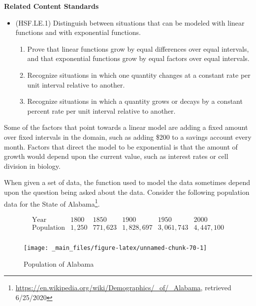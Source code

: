 \documentclass[
]{book}
\providecommand{\tightlist}{%
  \setlength{\itemsep}{0pt}\setlength{\parskip}{0pt}}
\newenvironment{standards}{}{}
\theoremstyle{definition}
\theoremstyle{definition}
\theoremstyle{definition}
\theoremstyle{definition}
\theoremstyle{remark}
\begin{document}
\begin{standards}

\begin{center}
\textbf{Related Content Standards}

\end{center}

\begin{itemize}
\tightlist
\item
  (HSF.LE.1) Distinguish between situations that can be modeled with linear functions and with exponential functions.

  \begin{enumerate}
  \def\labelenumi{\alph{enumi}.}
  \tightlist
  \item
    Prove that linear functions grow by equal differences over equal intervals, and that exponential functions grow by equal factors over equal intervals.
  \item
    Recognize situations in which one quantity changes at a constant rate per unit interval relative to another.
  \item
    Recognize situations in which a quantity grows or decays by a constant percent rate per unit interval relative to another.
  \end{enumerate}
\end{itemize}

\end{standards}

Some of the factors that point towards a linear model are adding a fixed amount over fixed intervals in the domain, such as adding \$200 to a savings account every month. Factors that direct the model to be exponential is that the amount of growth would depend upon the current value, such as interest rates or cell division in biology.

When given a set of data, the function used to model the data sometimes depend upon the question being asked about the data. Consider the following population data for the State of Alabama\footnote{\url{https://en.wikipedia.org/wiki/Demographics/_of/_Alabama}, retrieved 6/25/2020}.

\[\begin{array}{c|ccccc}
 \mbox{Year} & 1800 & 1850 & 1900 & 1950 & 2000 \\ \hline
 \mbox{Population} & 1,250  & 771,623  & 1,828,697 & 3,061,743 & 4,447,100 \\
\end{array}\]

\begin{figure}

{\centering \texttt{[image: \_main\_files/figure-latex/unnamed-chunk-70-1]} 

}

\caption{Population of Alabama}\label{fig:unnamed-chunk-70}
\end{figure}
\end{document}
